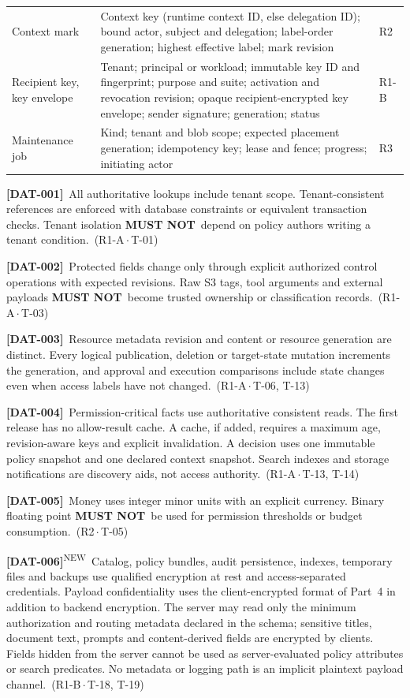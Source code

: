 \documentclass[11pt,a4paper]{article}
\newcommand{\mustnot}{\textbf{MUST NOT}}
\newcommand{\reqtag}[2]{{\footnotesize\color{accent}(#1\,$\cdot$\,#2)}}
\newcommand{\req}[4]{\par\noindent\hypertarget{req:#1}{\textbf{[#1]}}\ #4\ \reqtag{#2}{#3}\par}
\newcommand{\reqn}[4]{\par\noindent\hypertarget{req:#1}{\textbf{[#1]}}\textsuperscript{\color{accent}\tiny NEW}\ #4\ \reqtag{#2}{#3}\par}
\begin{document}
\begin{longtable}{@{}P{0.20\textwidth}P{0.62\textwidth}P{0.08\textwidth}@{}}
Context mark & Context key (runtime context ID, else delegation ID); bound actor, subject and delegation; label-order generation; highest effective label; mark revision & R2\\
Recipient key, key envelope & Tenant; principal or workload; immutable key ID and fingerprint; purpose and suite; activation and revocation revision; opaque recipient-encrypted key envelope; sender signature; generation; status & R1-B\\
Maintenance job & Kind; tenant and blob scope; expected placement generation; idempotency key; lease and fence; progress; initiating actor & R3\\
\bottomrule
\end{longtable}
\req{DAT-001}{R1-A}{T-01}{All authoritative lookups include tenant scope. Tenant-consistent references are enforced with database constraints or equivalent transaction checks. Tenant isolation \mustnot\ depend on policy authors writing a tenant condition.}
\req{DAT-002}{R1-A}{T-03}{Protected fields change only through explicit authorized control operations with expected revisions. Raw S3 tags, tool arguments and external payloads \mustnot\ become trusted ownership or classification records.}
\req{DAT-003}{R1-A}{T-06, T-13}{Resource metadata revision and content or resource generation are distinct. Every logical publication, deletion or target-state mutation increments the generation, and approval and execution comparisons include state changes even when access labels have not changed.}
\req{DAT-004}{R1-A}{T-13, T-14}{Permission-critical facts use authoritative consistent reads. The first release has no allow-result cache. A cache, if added, requires a maximum age, revision-aware keys and explicit invalidation. A decision uses one immutable policy snapshot and one declared context snapshot. Search indexes and storage notifications are discovery aids, not access authority.}
\req{DAT-005}{R2}{T-05}{Money uses integer minor units with an explicit currency. Binary floating point \mustnot\ be used for permission thresholds or budget consumption.}

\reqn{DAT-006}{R1-B}{T-18, T-19}{Catalog, policy bundles, audit persistence, indexes, temporary files and backups use qualified encryption at rest and access-separated credentials. Payload confidentiality uses the client-encrypted format of Part~4 in addition to backend encryption. The server may read only the minimum authorization and routing metadata declared in the schema; sensitive titles, document text, prompts and content-derived fields are encrypted by clients. Fields hidden from the server cannot be used as server-evaluated policy attributes or search predicates. No metadata or logging path is an implicit plaintext payload channel.}
\end{document}

